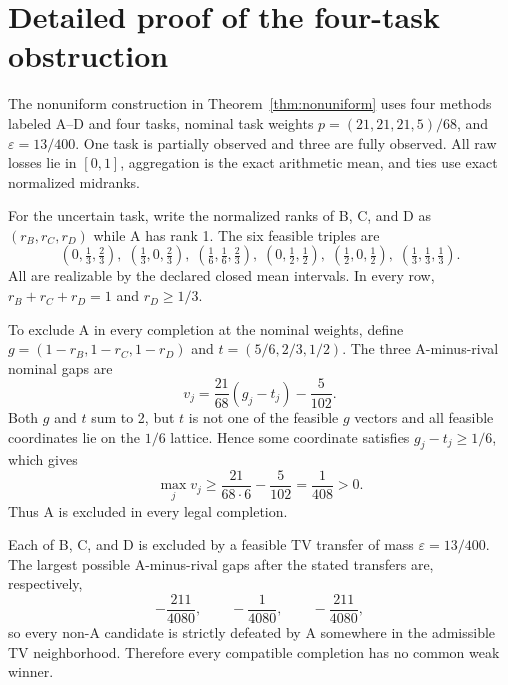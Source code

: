\documentclass[preprint,11pt]{elsarticle}
\begin{document}
\appendix
{}
\renewcommand{\theequation}{\Alph{section}.\arabic{equation}}
\renewcommand{\thefigure}{\Alph{section}.\arabic{figure}}
\renewcommand{\thetable}{\Alph{section}.\arabic{table}}

\section{Detailed proof of the four-task obstruction}\label{app:fourtask}
The nonuniform construction in Theorem~\ref{thm:nonuniform} uses four methods labeled A--D and four tasks, nominal task weights $p=(21,21,21,5)/68$, and $\varepsilon=13/400$. One task is partially observed and three are fully observed. All raw losses lie in $[0,1]$, aggregation is the exact arithmetic mean, and ties use exact normalized midranks.

For the uncertain task, write the normalized ranks of B, C, and D as $(r_B,r_C,r_D)$ while A has rank 1. The six feasible triples are
\begin{equation}\label{eq:app_types}
(0,\tfrac13,\tfrac23),\;(\tfrac13,0,\tfrac23),\;(\tfrac16,\tfrac16,\tfrac23),\;(0,\tfrac12,\tfrac12),\;(\tfrac12,0,\tfrac12),\;(\tfrac13,\tfrac13,\tfrac13).
\end{equation}
All are realizable by the declared closed mean intervals. In every row, $r_B+r_C+r_D=1$ and $r_D\ge 1/3$.

To exclude A in every completion at the nominal weights, define $g=(1-r_B,1-r_C,1-r_D)$ and $t=(5/6,2/3,1/2)$. The three A-minus-rival nominal gaps are
\begin{equation}\label{eq:app_vj}
v_j=\frac{21}{68}(g_j-t_j)-\frac{5}{102}.
\end{equation}
Both $g$ and $t$ sum to 2, but $t$ is not one of the feasible $g$ vectors and all feasible coordinates lie on the $1/6$ lattice. Hence some coordinate satisfies $g_j-t_j\ge 1/6$, which gives
\begin{equation}\label{eq:app_A_margin}
\max_j v_j\ge \frac{21}{68\cdot6}-\frac{5}{102}=\frac1{408}>0.
\end{equation}
Thus A is excluded in every legal completion.

Each of B, C, and D is excluded by a feasible TV transfer of mass $\varepsilon=13/400$. The largest possible A-minus-rival gaps after the stated transfers are, respectively,
\begin{equation}\label{eq:app_nonA_gaps}
-\frac{211}{4080},\qquad -\frac{1}{4080},\qquad -\frac{211}{4080},
\end{equation}
so every non-A candidate is strictly defeated by A somewhere in the admissible TV neighborhood. Therefore every compatible completion has no common weak winner.
\end{document}
